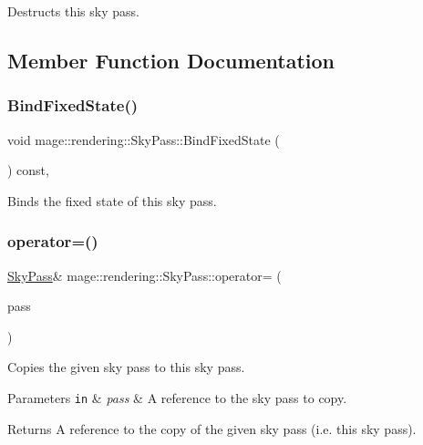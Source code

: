 Destructs this sky pass. 

\subsection{Member Function Documentation}
\mbox{\label{classmage_1_1rendering_1_1_sky_pass_ab2e7bf506b3a038264579aa3c494f14d}} 
\subsubsection{\texorpdfstring{Bind\+Fixed\+State()}{BindFixedState()}}
{\footnotesize\ttfamily void mage\+::rendering\+::\+Sky\+Pass\+::\+Bind\+Fixed\+State (\begin{DoxyParamCaption}{ }\end{DoxyParamCaption}) const\hspace{0.3cm}{\ttfamily [private]}, {\ttfamily [noexcept]}}

Binds the fixed state of this sky pass. \mbox{\label{classmage_1_1rendering_1_1_sky_pass_a8364836c5db0dc3e9894e1749ab302e8}} 
\subsubsection{\texorpdfstring{operator=()}{operator=()}\hspace{0.1cm}{\footnotesize\ttfamily [1/2]}}
{\footnotesize\ttfamily \mbox{\hyperlink{classmage_1_1rendering_1_1_sky_pass}{Sky\+Pass}}\& mage\+::rendering\+::\+Sky\+Pass\+::operator= (\begin{DoxyParamCaption}\item[{const \mbox{\hyperlink{classmage_1_1rendering_1_1_sky_pass}{Sky\+Pass}} \&}]{pass }\end{DoxyParamCaption})\hspace{0.3cm}{\ttfamily [delete]}}

Copies the given sky pass to this sky pass.


\begin{DoxyParams}[1]{Parameters}
\mbox{\tt in}  & {\em pass} & A reference to the sky pass to copy. \\
\hline
\end{DoxyParams}
\begin{DoxyReturn}{Returns}
A reference to the copy of the given sky pass (i.\+e. this sky pass). 
\end{DoxyReturn}
\mbox{\label{classmage_1_1rendering_1_1_sky_pass_ad844a754a13fa90ef87aa62745ea936d}} 
